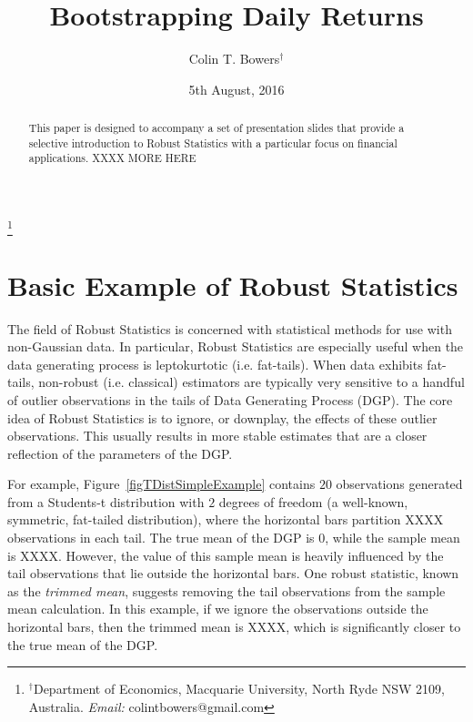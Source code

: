 \documentclass[12pt,a4paper]{amsart}
\begin{document}
\title{Bootstrapping Daily Returns}

\author[C. Bowers]{Colin T. Bowers$^\dag$}
\thanks{$^\dag$Department of Economics, Macquarie University, North Ryde NSW 2109, Australia.  \textit{Email:} colintbowers@gmail.com}


\date{5th August, 2016}

\maketitle

\begin{abstract}
This paper is designed to accompany a set of presentation slides that provide a selective introduction to Robust Statistics with a particular focus on financial applications. XXXX MORE HERE
\end{abstract}

\section{Basic Example of Robust Statistics}\label{secBasicExample}

The field of Robust Statistics is concerned with statistical methods for use with non-Gaussian data. In particular, Robust Statistics are especially useful when the data generating process is leptokurtotic (i.e. fat-tails). When data exhibits fat-tails, non-robust (i.e. classical) estimators are typically very sensitive to a handful of outlier observations in the tails of Data Generating Process (DGP). The core idea of Robust Statistics is to ignore, or downplay, the effects of these outlier observations. This usually results in more stable estimates that are a closer reflection of the parameters of the DGP.

For example, Figure~\ref{figTDistSimpleExample} contains $20$ observations generated from a Students-t distribution with $2$ degrees of freedom (a well-known, symmetric, fat-tailed distribution), where the horizontal bars partition XXXX observations in each tail. The true mean of the DGP is $0$, while the sample mean is XXXX. However, the value of this sample mean is heavily influenced by the tail observations that lie outside the horizontal bars. One robust statistic, known as the \emph{trimmed mean}, suggests removing the tail observations from the sample mean calculation. In this example, if we ignore the observations outside the horizontal bars, then the trimmed mean is XXXX, which is significantly closer to the true mean of the DGP.
\end{document}
